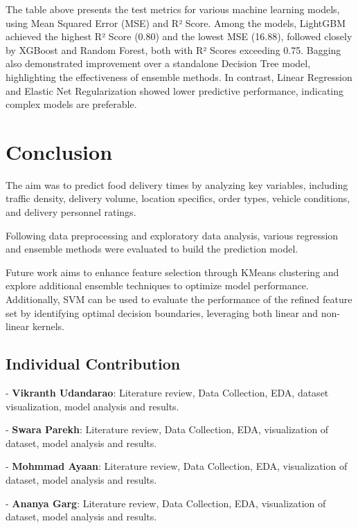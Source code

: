 \documentclass[10pt,twocolumn,letterpaper]{article}
\begin{document}
    The table above presents the test metrics for various machine learning models, using Mean Squared Error (MSE) and R² Score. Among the models, LightGBM achieved the highest R² Score (0.80) and the lowest MSE (16.88), followed closely by XGBoost and Random Forest, both with R² Scores exceeding 0.75. Bagging also demonstrated improvement over a standalone Decision Tree model, highlighting the effectiveness of ensemble methods. In contrast, Linear Regression and Elastic Net Regularization showed lower predictive performance, indicating complex models are preferable.

\section{Conclusion}
    The aim was to predict food delivery times by analyzing key variables, including traffic density, delivery volume, location specifics, order types, vehicle conditions, and delivery personnel ratings.

    Following data preprocessing and exploratory data analysis, various regression and ensemble methods were evaluated to build the prediction model.

    Future work aims to enhance feature selection through KMeans clustering and explore additional ensemble techniques to optimize model performance. Additionally, SVM can be used to evaluate the performance of the refined feature set by identifying optimal decision boundaries, leveraging both linear and non-linear kernels.

    \subsection{Individual Contribution}
        - \textbf{Vikranth Udandarao}: Literature review, Data Collection, EDA, dataset visualization, model analysis and results.

        - \textbf{Swara Parekh}: Literature review, Data Collection, EDA, visualization of dataset, model analysis and results.

        - \textbf{Mohmmad Ayaan}: Literature review, Data Collection, EDA, visualization of dataset, model analysis and results.

        - \textbf{Ananya Garg}: Literature review, Data Collection, EDA, visualization of dataset, model analysis and results.
\end{document}
